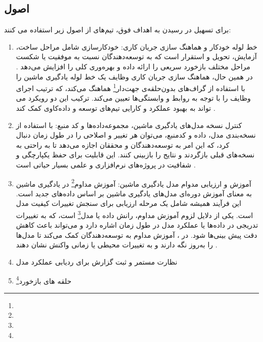 \subsection{اصول}
 برای تسهیل در رسیدن به اهداف فوق، تیم‌های  از اصول زیر استفاده می کنند:
\begin{enumerate}
	\item 
	خط لوله خودکار  و هماهنگ سازی جریان کاری:
	خودکارسازی  شامل مراحل ساخت، آزمایش، تحویل و استقرار است که به توسعه‌دهندگان نسبت به موفقیت یا شکست مراحل مختلف بازخورد سریعی را ارائه داده و بهره‌وری کلی را افزایش می‌دهد \cite{MLOpsPipeline1}. در همین حال، هماهنگ سازی جریان کاری وظایف یک خط لوله‌ یادگیری ماشین را با استفاده از گراف‌های بدون‌حلقه‌ی جهت‌دار\footnote{} هماهنگ می‌کند، که ترتیب اجرای وظایف را با توجه به روابط و وابستگی‌ها تعیین می‌کند. ترکیب این دو رویکرد می ‌تواند به بهبود عملکرد و کارایی تیم‌های توسعه و داده‌کاوی کمک کند \cite{MLOpsWO1}.
	\item 
	کنترل نسخه مدل‌های یادگیری ماشین، مجموعه‌داده‌ها و کد منبع:
با استفاده از نسخه‌بندی مدل، داده و کدمنبع، می‌توان هر تغییر و اصلاحی را در طول زمان دنبال کرد، که این امر به توسعه‌دهندگان و محققان اجازه می‌دهد تا به راحتی به نسخه‌های قبلی بازگردند و نتایج را بازبینی کنند. این قابلیت برای حفظ یکپارچگی و شفافیت در پروژه‌های نرم‌افزاری و علمی بسیار حیاتی است \cite{MLOpsPipeline1}.
	\item 
	آموزش و ارزیابی مدوام مدل یادگیری ماشین:
آموزش مداوم\footnote{} در یادگیری ماشین به معنای آموزش دوره‌ای مدل‌های یادگیری ماشین بر اساس داده‌های جدید است. این فرآیند همیشه شامل یک مرحله ارزیابی برای سنجش تغییرات کیفیت مدل است. یکی از دلایل لزوم آموزش مداوم، رانش داده یا مدل\footnote{} است، که به تغییرات تدریجی در داده‌ها یا عملکرد مدل در طول زمان اشاره دارد و می‌تواند باعث کاهش دقت پیش ‌بینی‌ها شود. در ، آموزش مداوم به توسعه‌دهندگان کمک می‌کند تا مدل‌ها را به‌روز نگه دارند و به تغییرات محیطی یا زمانی واکنش نشان دهند \cite{MLOpsCT1,MLOpsCT2}.
	\item 
	نظارت مستمر و ثبت گزارش برای ردیابی عملکرد مدل
	\item 
	حلقه های بازخورد\footnote{}
\end{enumerate}



